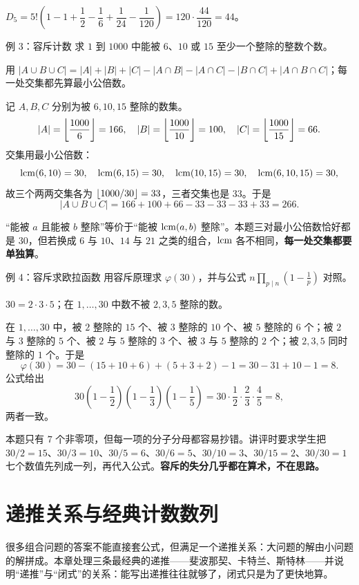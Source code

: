 \sol $D_5=5!\left(1-1+\dfrac12-\dfrac16+\dfrac1{24}-\dfrac1{120}\right)=120\cdot\dfrac{44}{120}=44$。

\begin{problem}{例 3：容斥计数}
求 $1$ 到 $1000$ 中能被 $6$、$10$ 或 $15$ 至少一个整除的整数个数。
\end{problem}
\hint 用 $|A\cup B\cup C|=|A|+|B|+|C|-|A\cap B|-|A\cap C|-|B\cap C|+|A\cap B\cap C|$；每一处交集都先算最小公倍数。

\sol 记 $A,B,C$ 分别为被 $6,10,15$ 整除的数集。
\[
|A|=\left\lfloor \frac{1000}{6}\right\rfloor=166,\quad |B|=\left\lfloor \frac{1000}{10}\right\rfloor=100,\quad |C|=\left\lfloor \frac{1000}{15}\right\rfloor=66.
\]
交集用最小公倍数：
\[
\operatorname{lcm}(6,10)=30,\quad \operatorname{lcm}(6,15)=30,\quad \operatorname{lcm}(10,15)=30,\quad \operatorname{lcm}(6,10,15)=30,
\]
故三个两两交集各为 $\left\lfloor 1000/30\right\rfloor=33$，三者交集也是 $33$。于是
\[
|A\cup B\cup C|=166+100+66-33-33-33+33=266.
\]

\begin{pitfall}[交集用的是最小公倍数]
“能被 $a$ 且能被 $b$ 整除”等价于“能被 $\operatorname{lcm}(a,b)$ 整除”。本题三对最小公倍数恰好都是 $30$，但若换成 $6$ 与 $10$、$14$ 与 $21$ 之类的组合，$\operatorname{lcm}$ 各不相同，\textbf{每一处交集都要单独算}。
\end{pitfall}

\begin{problem}{例 4：容斥求欧拉函数}
用容斥原理求 $\varphi(30)$，并与公式 $n\prod_{p\mid n}(1-\frac1p)$ 对照。
\end{problem}
\hint $30=2\cdot3\cdot5$；在 $1,\ldots,30$ 中数不被 $2,3,5$ 整除的数。

\sol 在 $1,\ldots,30$ 中，被 $2$ 整除的 $15$ 个、被 $3$ 整除的 $10$ 个、被 $5$ 整除的 $6$ 个；被 $2$ 与 $3$ 整除的 $5$ 个、被 $2$ 与 $5$ 整除的 $3$ 个、被 $3$ 与 $5$ 整除的 $2$ 个；被 $2,3,5$ 同时整除的 $1$ 个。于是
\[
\varphi(30)=30-(15+10+6)+(5+3+2)-1=30-31+10-1=8.
\]
公式给出
\[
30\left(1-\frac12\right)\left(1-\frac13\right)\left(1-\frac15\right)
=30\cdot\frac12\cdot\frac23\cdot\frac45=8,
\]
两者一致。

\begin{teach}[容斥的算术要逐项写]
本题只有 $7$ 个非零项，但每一项的分子分母都容易抄错。讲评时要求学生把 $30/2=15$、$30/3=10$、$30/5=6$、$30/6=5$、$30/10=3$、$30/15=2$、$30/30=1$ 七个数值先列成一列，再代入公式。\textbf{容斥的失分几乎都在算术，不在思路。}
\end{teach}

\chapter{递推关系与经典计数数列}
\begin{chapterintro}[章节导读]
很多组合问题的答案不能直接套公式，但满足一个递推关系：大问题的解由小问题的解拼成。本章处理三条最经典的递推——斐波那契、卡特兰、斯特林——并说明“递推”与“闭式”的关系：能写出递推往往就够了，闭式只是为了更快地算。
\end{chapterintro}

